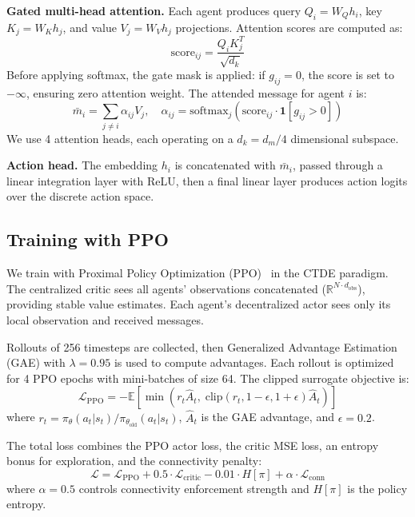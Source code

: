 \documentclass[letterpaper, 10 pt, journal, twoside]{IEEEtran}
\begin{document}
\textbf{Gated multi-head attention.} Each agent produces query $Q_i = W_Q h_i$, key $K_j = W_K h_j$, and value $V_j = W_V h_j$ projections. Attention scores are computed as:
\begin{equation}
\text{score}_{ij} = \frac{Q_i K_j^T}{\sqrt{d_k}}
\end{equation}
Before applying softmax, the gate mask is applied: if $g_{ij} = 0$, the score is set to $-\infty$, ensuring zero attention weight. The attended message for agent $i$ is:
\begin{equation}
\bar{m}_i = \sum_{j \neq i} \alpha_{ij} V_j, \quad \alpha_{ij} = \text{softmax}_j(\text{score}_{ij} \cdot \mathbf{1}[g_{ij} > 0])
\end{equation}
We use 4 attention heads, each operating on a $d_k = d_m / 4$ dimensional subspace.

\textbf{Action head.} The embedding $h_i$ is concatenated with $\bar{m}_i$, passed through a linear integration layer with ReLU, then a final linear layer produces action logits over the discrete action space.

\subsection{Training with PPO}

We train with Proximal Policy Optimization (PPO)~\cite{Schulman2017} in the CTDE paradigm. The centralized critic sees all agents' observations concatenated ($\mathbb{R}^{N \cdot d_{\text{obs}}}$), providing stable value estimates. Each agent's decentralized actor sees only its local observation and received messages.

Rollouts of 256 timesteps are collected, then Generalized Advantage Estimation (GAE) with $\lambda = 0.95$ is used to compute advantages. Each rollout is optimized for 4 PPO epochs with mini-batches of size 64. The clipped surrogate objective is:
\begin{equation}
\mathcal{L}_{\text{PPO}} = -\mathbb{E}\left[\min\left(r_t \hat{A}_t, \; \text{clip}(r_t, 1-\epsilon, 1+\epsilon)\hat{A}_t\right)\right]
\end{equation}
where $r_t = \pi_\theta(a_t | s_t) / \pi_{\theta_{\text{old}}}(a_t | s_t)$, $\hat{A}_t$ is the GAE advantage, and $\epsilon = 0.2$.

The total loss combines the PPO actor loss, the critic MSE loss, an entropy bonus for exploration, and the connectivity penalty:
\begin{equation}
\mathcal{L} = \mathcal{L}_{\text{PPO}} + 0.5 \cdot \mathcal{L}_{\text{critic}} - 0.01 \cdot H[\pi] + \alpha \cdot \mathcal{L}_{\text{conn}}
\label{eq:total_loss}
\end{equation}
where $\alpha = 0.5$ controls connectivity enforcement strength and $H[\pi]$ is the policy entropy.
\end{document}
